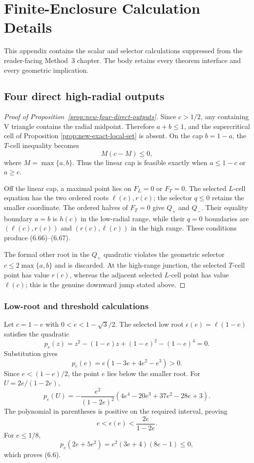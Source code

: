 \section{Finite-Enclosure Calculation Details}
\label{app:finite-calculations}

This appendix contains the scalar and selector calculations suppressed from
the reader-facing Method~3 chapter.  The body retains every theorem interface
and every geometric implication.

\subsection{Four direct high-radial outputs}
\label{subsec:calc-four-direct-outputs}

\begin{proof}[Proof of Proposition~\ref{prop:new-four-direct-outputs}]
Since $c>1/2$, any containing V triangle contains the radial midpoint.
Therefore $a+b\le1$, and the supercritical cell of Proposition
\ref{prop:new-exact-local-set} is absent.  On the cap $b=1-a$, the $T$-cell
inequality becomes
\[
 M(c-M)\le0,
\]
where $M=\max\{a,b\}$.  Thus the linear cap is feasible exactly when
$a\le1-c$ or $a\ge c$.

Off the linear cap, a maximal point lies on $F_L=0$ or $F_T=0$.  The selected
$L$-cell equation has the two ordered roots $\ell(c),r(c)$; the selector
$q\le0$ retains the smaller coordinate.  The ordered halves of $F_T=0$ give
$Q_+$ and $Q_-$.  Their equality boundary $a=b$ is $h(c)$ in the low-radial
range, while their $q=0$ boundaries are
$(\ell(c),r(c))$ and $(r(c),\ell(c))$ in the high range.  These conditions
produce (6.66)--(6.67).

The formal other root in the $Q_+$ quadratic violates the geometric selector
$c\le2\max\{a,b\}$ and is discarded.  At the high-range junction, the
selected $T$-cell point has value $r(c)$, whereas the adjacent selected
$L$-cell point has value $\ell(c)$; this is the genuine downward jump stated
above.
\end{proof}

\subsubsection{Low-root and threshold calculations}

Let $c=1-e$ with $0<e<1-\sqrt3/2$.  The selected low root
$\epsilon(e)=\ell(1-e)$ satisfies the quadratic
\[
 p_e(z)=z^2-(1-e)z+(1-e)^2-(1-e)^4=0.
 \tag{6.68}
\]
Substitution gives
\[
 p_e(e)=e(1-3e+4e^2-e^3)>0.
\]
Since $e<(1-e)/2$, the point $e$ lies below the smaller root.  For
$U=2e/(1-2e)$,
\[
 p_e(U)=
 -\frac{e^2}{(1-2e)^2}
 (4e^4-20e^3+37e^2-28e+3).
\]
The polynomial in parentheses is positive on the required interval, proving
\[
 e<\epsilon(e)<\frac{2e}{1-2e}.
\]
For $e\le1/8$,
\[
 p_e(2e+5e^2)=e^2(3e+4)(8e-1)\le0,
\]
which proves (6.6).

